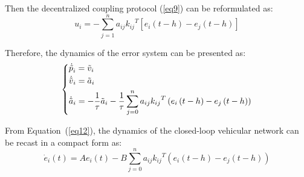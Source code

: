 \documentclass[a4paper]{cas-sc}
\begin{document}
Then the decentralized coupling protocol (\ref{eq9}) can be reformulated as:
\begin{equation}
  {u_i} =  - \sum\limits_{j = 1}^n {{a_{ij}}{k_{ij}}^T\left[ {{e_i}(t - h) - {e_j}(t - h)} \right]}
  \label{eq11}
\end{equation}

Therefore, the dynamics of the error system can be presented as:
\begin{equation}
  \left\{ \begin{gathered}
    {{\dot {\tilde p}}_i} = {{\tilde v}_i} \hfill \\
    {{\dot {\tilde v}}_i} = {{\tilde a}_i} \hfill \\
    {{\dot {\tilde a}}_i} =  - \frac{1}{\tau }{{\tilde a}_i} - \frac{1}{\tau }\sum\limits_{j = 0}^n {{a_{ij}}{k_{ij}}^T\left( {{e_i}\left( {t - h} \right) - {e_j}\left( {t - h} \right)} \right)}  \hfill \\
  \end{gathered}  \right.
  \label{eq12}
\end{equation}

From Equation~(\ref{eq12}), the dynamics of the closed-loop vehicular network can be recast in a compact form as:
\begin{equation}
  {\dot e_i}\left( t \right) = A{e_i}\left( t \right) - B\sum\limits_{j = 0}^n {{a_{ij}}{k_{ij}}^T\left( {{e_i}\left( {t - h} \right) - {e_j}\left( {t - h} \right)} \right)}
  \label{eq13}
\end{equation}
\end{document}
